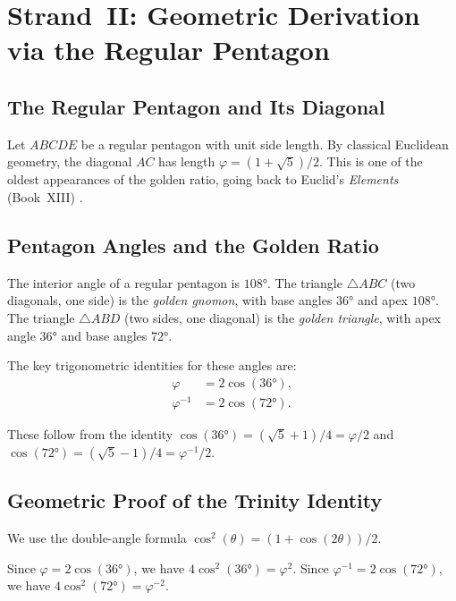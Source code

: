 
\section{Strand~II: Geometric Derivation via the Regular Pentagon}%
\label{sec:strand-II-geometric}

\subsection{The Regular Pentagon and Its Diagonal}

Let $ABCDE$ be a regular pentagon with unit side length.
By classical Euclidean geometry, the diagonal $AC$ has length
$\varphi = (1+\sqrt{5})/2$.
This is one of the oldest appearances of the golden ratio,
going back to Euclid's \emph{Elements} (Book~XIII) \cite{koshy_fib_lucas}.

\subsection{Pentagon Angles and the Golden Ratio}

The interior angle of a regular pentagon is $108°$.
The triangle $\triangle ABC$ (two diagonals, one side) is the
\emph{golden gnomon}, with base angles $36°$ and apex $108°$.
The triangle $\triangle ABD$ (two sides, one diagonal) is the
\emph{golden triangle}, with apex angle $36°$ and base angles $72°$.

The key trigonometric identities for these angles are:
\begin{align*}
  \varphi &= 2\cos(36°),\\
  \varphi^{-1} &= 2\cos(72°).
\end{align*}

These follow from the identity $\cos(36°) = (\sqrt{5}+1)/4 = \varphi/2$
and $\cos(72°) = (\sqrt{5}-1)/4 = \varphi^{-1}/2$.

\subsection{Geometric Proof of the Trinity Identity}

We use the double-angle formula $\cos^{2}(\theta) = (1+\cos(2\theta))/2$.

Since $\varphi = 2\cos(36°)$, we have $4\cos^{2}(36°) = \varphi^{2}$.
Since $\varphi^{-1} = 2\cos(72°)$, we have $4\cos^{2}(72°) = \varphi^{-2}$.

